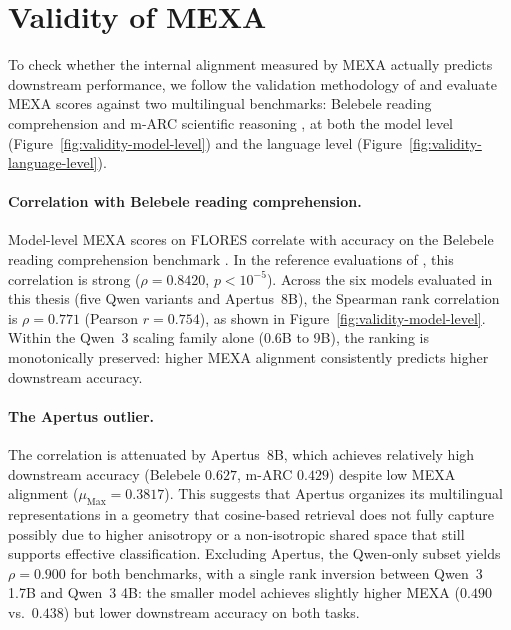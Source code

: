 \section{Validity of MEXA}
\label{sec:results-validity}

To check whether the internal alignment measured by MEXA actually predicts downstream performance, we follow the validation methodology of \citet{kargaran2025mexa} and evaluate MEXA scores against two multilingual benchmarks: Belebele reading comprehension \citep{bandarkar2024belebele} and m-ARC scientific reasoning \citep{lai2023okapi}, at both the model level (Figure~\ref{fig:validity-model-level}) and the language level (Figure~\ref{fig:validity-language-level}).

\paragraph{Correlation with Belebele reading comprehension.}
Model-level MEXA scores on FLORES correlate with accuracy on the Belebele reading comprehension benchmark \citep{bandarkar2024belebele}. In the reference evaluations of \citet{kargaran2025mexa}, this correlation is strong ($\rho = 0.8420$, $p < 10^{-5}$). Across the six models evaluated in this thesis (five Qwen variants and Apertus~8B), the Spearman rank correlation is $\rho = 0.771$ (Pearson $r = 0.754$), as shown in Figure~\ref{fig:validity-model-level}. Within the Qwen~3 scaling family alone (0.6B to 9B), the ranking is monotonically preserved: higher MEXA alignment consistently predicts higher downstream accuracy.

\paragraph{The Apertus outlier.}
The correlation is attenuated by Apertus~8B, which achieves relatively high downstream accuracy (Belebele $0.627$, m-ARC $0.429$) despite low MEXA alignment ($\mu_{\text{Max}} = 0.3817$). This suggests that Apertus organizes its multilingual representations in a geometry that cosine-based retrieval does not fully capture possibly due to higher anisotropy or a non-isotropic shared space that still supports effective classification. Excluding Apertus, the Qwen-only subset yields $\rho = 0.900$ for both benchmarks, with a single rank inversion between Qwen~3 1.7B and Qwen~3 4B: the smaller model achieves slightly higher MEXA ($0.490$ vs.\ $0.438$) but lower downstream accuracy on both tasks.


